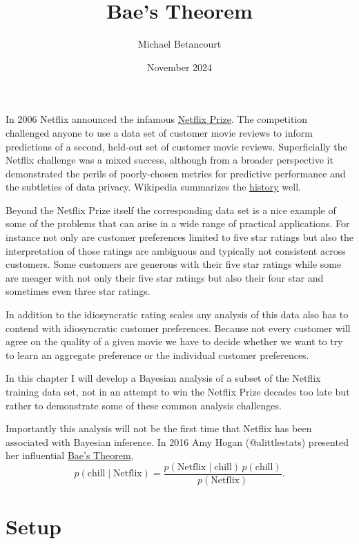 \documentclass[
  letterpaper,
  DIV=11,
  numbers=noendperiod]{scrartcl}
\title{Bae's Theorem}
\author{Michael Betancourt}
\date{November 2024}
\renewcommand*\contentsname{Table of contents}
\newcommand\contentsname{Table of contents}
\begin{document}
\maketitle

\renewcommand*\contentsname{Table of contents}
{
\hypersetup{linkcolor=}
\setcounter{tocdepth}{3}
\tableofcontents
}
In 2006 Netflix announced the infamous
\href{https://web.archive.org/web/20200510213032/https://www.netflixprize.com/assets/rules.pdf}{Netflix
Prize}. The competition challenged anyone to use a data set of customer
movie reviews to inform predictions of a second, held-out set of
customer movie reviews. Superficially the Netflix challenge was a mixed
success, although from a broader perspective it demonstrated the perils
of poorly-chosen metrics for predictive performance and the subtleties
of data privacy. Wikipedia summarizes the
\href{https://en.wikipedia.org/wiki/Netflix_Prize}{history} well.

Beyond the Netflix Prize itself the corresponding data set is a nice
example of some of the problems that can arise in a wide range of
practical applications. For instance not only are customer preferences
limited to five star ratings but also the interpretation of those
ratings are ambiguous and typically not consistent across customers.
Some customers are generous with their five star ratings while some are
meager with not only their five star ratings but also their four star
and sometimes even three star ratings.

In addition to the idiosyncratic rating scales any analysis of this data
also has to contend with idiosyncratic customer preferences. Because not
every customer will agree on the quality of a given movie we have to
decide whether we want to try to learn an aggregate preference or the
individual customer preferences.

In this chapter I will develop a Bayesian analysis of a subset of the
Netflix training data set, not in an attempt to win the Netflix Prize
decades too late but rather to demonstrate some of these common analysis
challenges.

Importantly this analysis will not be the first time that Netflix has
been associated with Bayesian inference. In 2016 Amy Hogan
(@alittlestats) presented her influential
\href{https://twitter.com/alittlestats/status/664923862853922820}{Bae's
Theorem}, \[
p( \text{chill} \mid \text{Netflix} )
=
\frac{ p( \text{Netflix} \mid \text{chill} ) \, p( \text{chill} ) }
{ p( \text{Netflix} ) }.
\]

\section{Setup}\label{setup}
\end{document}
